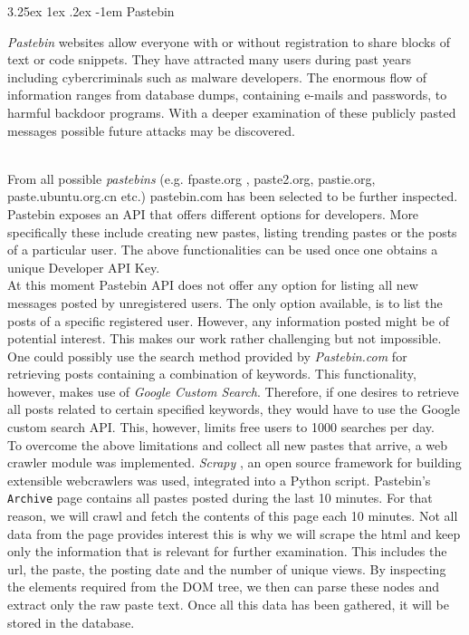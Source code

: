 \documentclass[12pt]{article}
\makeatletter
\renewcommand\paragraph{\@startsection{paragraph}{5}{\z@}%
  {3.25ex \@plus1ex \@minus.2ex}%
  {-1em}%
  {\normalfont\normalsize\bfseries}}
\makeatother
\begin{document}
\paragraph{Pastebin}
\hfill \break\\
\parbox{\linewidth}{
\textit{Pastebin} websites \cite{fpaste} \cite{pastebin} allow everyone with or without registration to share blocks of text or code snippets. They have attracted many users during past years including cybercriminals such as malware developers\cite{pastebin-magazine}. The enormous flow of information ranges from database dumps, containing e-mails and passwords, to harmful backdoor programs. With a deeper examination of these publicly pasted messages possible future attacks may be discovered.
}
\hfill \break\\
From all possible \textit{pastebins} (e.g. fpaste.org \cite{fpaste}, paste2.org, pastie.org\cite{pastebin-pastie}, 
paste.ubuntu.org.cn \cite{pastebin-ubuntu} etc.) pastebin.com \cite{pastebin} has been selected to be further inspected.
\hfill \break
\\
Pastebin exposes an API that offers different options for developers. More specifically these include creating new pastes, listing trending pastes or the posts of a particular user. The above functionalities can be used once one obtains a unique Developer API Key. 
\hfill \break
\\
At this moment Pastebin API \cite{pastebin} does not offer any option for listing all new messages posted by unregistered users. The only option available, is to list the posts of a specific registered user. However, any information posted might be of potential interest. 
This makes our work rather challenging but not impossible.  
\hfill \break
\\
One could possibly use the search method provided by \textit{Pastebin.com} for retrieving posts containing a combination of keywords.
This functionality, however, makes use of \textit{Google Custom Search}. Therefore, if one desires to retrieve all posts related to certain specified keywords, they would have to use the Google custom search API. This, however, limits free users to 1000 searches per day. 
\hfill \break
\\
To overcome the above limitations and collect all new pastes that arrive, a web crawler module was implemented. \textit{Scrapy} \cite{scrapy}, an open source framework for building extensible webcrawlers was used, integrated into a Python script. Pastebin's \texttt{Archive} page contains all pastes posted during the last 10 minutes. For that reason, we will crawl and fetch the contents of this page each 10 minutes. Not all data from the page provides interest this is why we will scrape the html and keep only the information that is relevant for further examination. This includes the url, the paste, the posting date and the number of unique views. By inspecting the elements required from the DOM tree, we then can parse these nodes and extract only the raw paste text. Once all this data has been gathered, it will be stored in the database.
\end{document}

